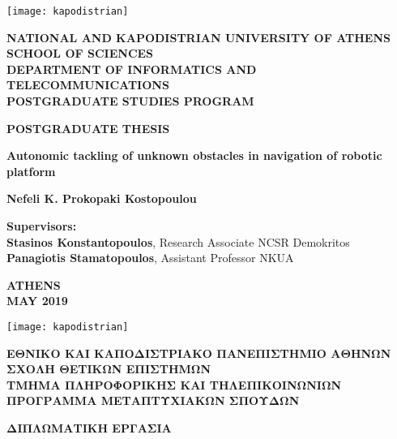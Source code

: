 \begin{center}
	\thispagestyle{empty}
	\texttt{[image: kapodistrian]}

	\large
	\textbf{NATIONAL AND KAPODISTRIAN UNIVERSITY OF ATHENS}\\
	\vspace{0.2cm}
	\normalsize
	\textbf{SCHOOL OF SCIENCES}\\
	\vspace{0.2cm}
	\textbf{DEPARTMENT OF INFORMATICS AND TELECOMMUNICATIONS}\\
	\vspace{0.2cm}
	\textbf{POSTGRADUATE STUDIES PROGRAM}
	
	\vspace{1.5cm}
	\textbf{POSTGRADUATE THESIS}
	
	\vspace{1.5cm}
	\Large
	\textbf{Autonomic tackling of unknown obstacles in navigation of robotic platform}
	
	\vspace{1.5cm}
	\normalsize
	\textbf{Nefeli K. Prokopaki Kostopoulou}
	
	\vspace{1.5cm}
	\textbf{Supervisors:}\\
	\textbf{Stasinos Konstantopoulos}, Research Associate NCSR Demokritos\\
	\textbf{Panagiotis Stamatopoulos}, Assistant Professor NKUA
	
	\vfill
	
	\vspace{0.8cm}
	\textbf{ATHENS}\\
	\vspace{0.2cm}
	\textbf{MAY 2019}
	\newpage
	
	
	\thispagestyle{empty}
	\texttt{[image: kapodistrian]}
	
	\large
	\textbf{ΕΘΝΙΚΟ ΚΑΙ ΚΑΠΟΔΙΣΤΡΙΑΚΟ ΠΑΝΕΠΙΣΤΗΜΙΟ ΑΘΗΝΩΝ}\\
	\vspace{0.2cm}
	\normalsize
	\textbf{ΣΧΟΛΗ ΘΕΤΙΚΩΝ ΕΠΙΣΤΗΜΩΝ}\\
	\vspace{0.2cm}
	\textbf{ΤΜΗΜΑ ΠΛΗΡΟΦΟΡΙΚΗΣ ΚΑΙ ΤΗΛΕΠΙΚΟΙΝΩΝΙΩΝ}\\
	\vspace{0.2cm}
	\textbf{ΠΡΟΓΡΑΜΜΑ ΜΕΤΑΠΤΥΧΙΑΚΩΝ ΣΠΟΥΔΩΝ}
	
	\vspace{1.5cm}
	\textbf{ΔΙΠΛΩΜΑΤΙΚΗ ΕΡΓΑΣΙΑ}
	

\end{center}
